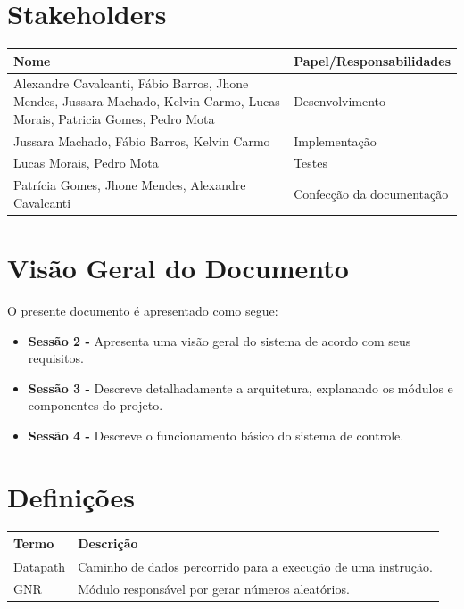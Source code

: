 \documentclass{report}
\begin{document}
  
  \section{Stakeholders}
    \FloatBarrier
    \begin{table}[H] 
      \begin{center}
        \begin{tabular}[pos]{|m{6cm} | m{8cm}|} 
          \hline 
          \cellcolor[gray]{0.9}\textbf{Nome} & \cellcolor[gray]{0.9}\textbf{Papel/Responsabilidades} \\ \hline
          Alexandre Cavalcanti, Fábio Barros, Jhone Mendes, Jussara Machado, Kelvin Carmo, Lucas Morais, Patricia Gomes, Pedro Mota & Desenvolvimento\\ \hline
          Jussara Machado, Fábio Barros, Kelvin Carmo & Implementação\\ \hline
          Lucas Morais, Pedro Mota & Testes\\ \hline
          Patrícia Gomes, Jhone Mendes, Alexandre Cavalcanti & Confecção da documentação\\ \hline
        \end{tabular}
      \end{center}
    \end{table} 

\section{Visão Geral do Documento}

O presente documento é apresentado como segue:
  
  \begin{itemize}
  \item \textbf{Sessão 2 -} Apresenta uma visão geral do sistema de acordo com seus requisitos.
  \item \textbf{Sessão 3 -} Descreve detalhadamente a arquitetura, explanando os módulos e componentes do projeto.
  \item \textbf{Sessão 4 -} Descreve o funcionamento básico do sistema de controle.
  \end{itemize}


  \section{Definições}
    \FloatBarrier
    \begin{table}[H]
      \begin{center}
        \begin{tabular}[pos]{|m{5cm} | m{9cm}|} 
          \hline
          \cellcolor[gray]{0.9}\textbf{Termo} & \cellcolor[gray]{0.9}\textbf{Descrição} \\ \hline
          Datapath & Caminho de dados percorrido para a execução de uma instrução. \\ \hline
          GNR & Módulo responsável por gerar números aleatórios. \\ \hline
        \end{tabular}
      \end{center}
    \end{table}  
\end{document}
